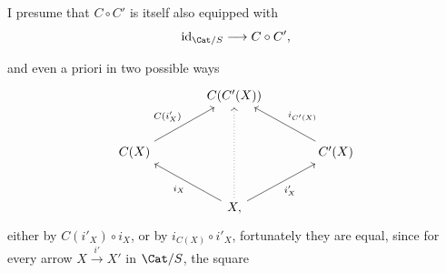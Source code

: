 I presume that $C \circ C'$ is itself also equipped with
\[
\mathrm{id}_{\Cat/S} \longrightarrow C \circ C',
\]

and even a priori in two possible ways
\[
\begin{tikzcd}[column sep=large, row sep=large]
& C(C'(X)) & \\
C(X) \arrow[ur, "C(i'_X)"] & & C'(X) \arrow[ul, "i_{C'(X)}"'] \\
& X, \arrow[ul, "i_X"] \arrow[ur, "i'_X"'] \arrow[uu, dotted] &
\end{tikzcd}
\]
either by $C(i'_X) \circ i_X$, or by $i_{C(X)} \circ i'_X$, fortunately they are equal, since for every arrow $X \xrightarrow{\ i'\ } X'$ in $\Cat/S$, the square %